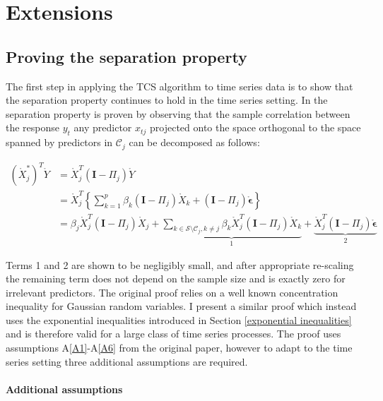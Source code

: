 \documentclass[11pt]{report}\usepackage[utf8]{inputenc}
\begin{document}
\chapter{Extensions} \label{extensions}
\section{Proving the separation property}\label{seperation}

The first step in applying the TCS algorithm to time series data is to show that the separation property continues to hold in the time series setting. In \cite{cho2012high} the separation property is proven by observing that the sample correlation between the response $y_t$ any predictor $x_{tj}$ projected onto the space orthogonal to the space spanned by predictors in $\mathcal{C}_j$ can be decomposed as follows:

\begin{align} \label{bounding}
    (\mathring{X}_j^*)^T\mathring{Y} & = \mathring{X}_j^T(\mathbf{I}-\Pi_j)\mathring{Y} \nonumber \\
    & = \mathring{X}_j^T \left \{ \sum_{k=1}^{p} \beta_k (\mathbf{I} - \Pi_j)\mathring{X}_k + (\mathbf{I} - \Pi_j)\mathring{\boldsymbol{\epsilon}}  \right \} \nonumber \\ 
    & = \beta_j \mathring{X}_j^T(\mathbf{I} -
     \Pi_j)\mathring{X}_j + \underbrace{\sum_{k \in \mathcal{S} \setminus  \mathcal{C}_j, k \neq j } \beta_k \mathring{X}_j^T (\mathbf{I} - \Pi_j) \mathring{X}_k}_{1} + \underbrace{\mathring{X}_j^T(\mathbf{I} - \Pi_j) \mathring{\boldsymbol{\epsilon}}}_{2} 
\end{align}

Terms 1 and 2 are shown to be negligibly small, and after appropriate re-scaling the remaining term does not depend on the sample size and is exactly zero for irrelevant predictors. The original proof relies on a well known concentration inequality for Gaussian random variables. I present a similar proof which instead uses the exponential inequalities introduced in Section \ref{exponential inequalities} and is therefore valid for a large class of time series processes. The proof uses assumptions A\ref{A1}-A\ref{A6} from the original paper, however to adapt to the time series setting three additional assumptions are required. 

\subsubsection{Additional assumptions}
\end{document}
